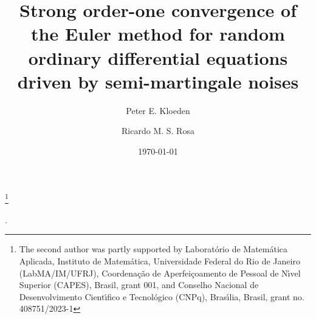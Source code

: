 \documentclass[reqno,12pt]{amsart}
\theoremstyle{plain} %
\theoremstyle{definition} %
\begin{document}


\title[Euler method for Random ODEs with semi-martingales]{Strong order-one convergence of the Euler method for random ordinary differential equations driven by semi-martingale noises}

\author[P. E. Kloeden]{Peter E. Kloeden}
\author[R. M. S. Rosa]{Ricardo M. S. Rosa}

\address[Peter E. Kloeden]{Mathematics Department, University of T\"ubingen, Germany}
\address[Ricardo M. S. Rosa]{Instituto de Matem\'atica, Universidade Federal do Rio de Janeiro, Brazil}


\date{\today}

\thanks{The second author was partly supported by Laborat\'orio de Matem\'atica Aplicada, Instituto de Matem\'atica, Universidade Federal do Rio de Janeiro (LabMA/IM/UFRJ), Coordena\c{c}\~ao de Aperfei\c{c}oamento de Pessoal de N\'{\i}vel Superior (CAPES), Brasil, grant 001, and Conselho Nacional de Desenvolvimento Cient\'{\i}fico e Tecnol\'ogico (CNPq), Bras\'{\i}lia, Brasil, grant no. 408751/2023-1}

\makeatletter
{}
\makeatother
{}

.
\end{document}
